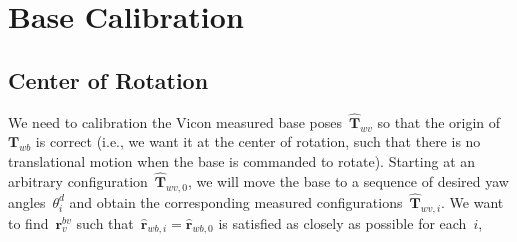 \documentclass{article}
\begin{document}
\section{Base Calibration}

\subsection{Center of Rotation}

We need to calibration the Vicon measured base poses~$\hat{\bm{T}}_{wv}$ so that
the origin of~$\bm{T}_{wb}$ is correct (i.e., we want it at the center of rotation, such that there is no translational motion when the base is commanded to rotate).
Starting at an arbitrary configuration~$\hat{\bm{T}}_{wv,0}$, we will move the base to
a sequence of desired yaw angles~$\theta^d_i$ and obtain the corresponding
measured configurations~$\hat{\bm{T}}_{wv,i}$. We want to find~$\bm{r}^{bv}_v$ such that~$\hat{\bm{r}}_{wb,i} = \hat{\bm{r}}_{wb,0}$
is satisfied as closely as possible for each~$i$,
\end{document}
